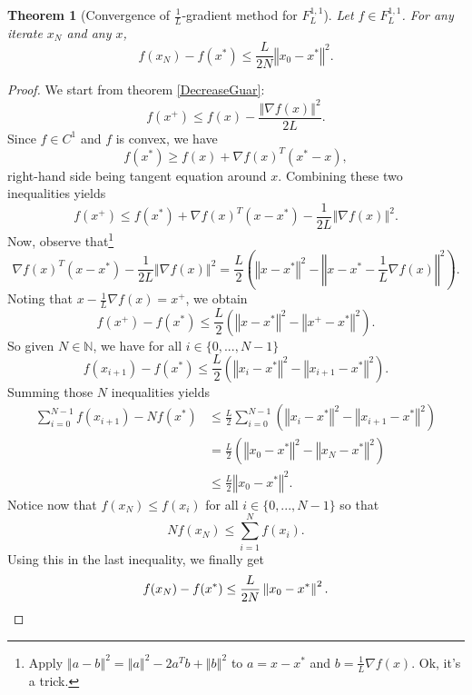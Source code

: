 \documentclass{article}
\newtheorem{theorem}{Theorem}
\theoremstyle{definition}
\newcommand{\vnorm}[1]{\left\Vert #1 \right\Vert}
\begin{document}
\begin{theorem}[Convergence of $\frac{1}{L}$-gradient method for $F_L^{1,1}$]
Let $f \in F_L^{1,1}$. For any iterate $x_N$ and any $x$,
\begin{equation*}
f(x_N) - f(x^*) \le \frac{L}{2N} \vnorm{x_0-x^*}^2 .
\end{equation*}
\end{theorem}
\begin{proof}
We start from theorem \ref{DecreaseGuar}:
\begin{equation*}
f(x^+) \le f(x) - \frac{{\vnorm{\nabla f(x)}}^2}{2L} .
\end{equation*}
Since $f \in C^1$ and $f$ is convex, we have
\begin{equation*}
f(x^*) \ge f(x) + \nabla f(x)^T(x^*-x),
\end{equation*}
right-hand side being tangent equation around $x$. Combining these two inequalities yields
\begin{equation*}
f(x^+) \le f(x^*) + \nabla f(x)^T(x-x^*) - \frac{1}{2L} {\vnorm{\nabla f(x)}}^2 .
\end{equation*}
Now, observe that\footnote{Apply $\vnorm{a-b}^2 = \vnorm{a}^2 - 2a^Tb + \vnorm{b}^2$ to $a = x-x^*$ and $b = \frac{1}{L}\nabla f(x)$. Ok, it's a trick.}
\begin{equation*}
\nabla f(x)^T(x-x^*) - \frac{1}{2L}{\vnorm{\nabla f(x)}}^2 = \frac{L}{2} \left( \vnorm{x-x^*}^2 - \vnorm{x-x^*-\frac{1}{L}\nabla f(x)}^2 \right) .
\end{equation*}
Noting that $x-\frac{1}{L}\nabla f(x) = x^+$, we obtain
\begin{equation*}
f(x^+) - f(x^*) \le \frac{L}{2} \left( \vnorm{x-x^*}^2 - \vnorm{x^+-x^*}^2 \right) .
\end{equation*}
So given $N \in \mathbb{N}$, we have for all $i \in \{0,...,N-1\}$
\begin{equation*}
f(x_{i+1}) - f(x^*) \le \frac{L}{2} \left( \vnorm{x_i-x^*}^2 - \vnorm{x_{i+1}-x^*}^2 \right) .
\end{equation*}
Summing those $N$ inequalities yields
\begin{align*}
\sum_{i=0}^{N-1}f(x_{i+1}) - N f(x^*) &\le \frac{L}{2} \sum_{i=0}^{N-1}\left( \vnorm{x_i-x^*}^2 - \vnorm{x_{i+1}-x^*}^2 \right) \\
&= \frac{L}{2} \left( \vnorm{x_0-x^*}^2 - \vnorm{x_N-x^*}^2 \right) \\
&\le \frac{L}{2} \vnorm{x_0-x^*}^2 .
\end{align*}
Notice now that $f(x_N) \le f(x_i)$ for all $i \in \{0,...,N-1\}$ so that
\begin{equation*}
 N f(x_N) \le \sum_{i=1}^Nf(x_i) .
\end{equation*}
Using this in the last inequality, we finally get
\begin{equation*}
f(x_{N}) - f(x^*) \le  \frac{L}{2N} \vnorm{x_0-x^*}^2 . \qedhere
\end{equation*}
\end{proof}
\end{document}
